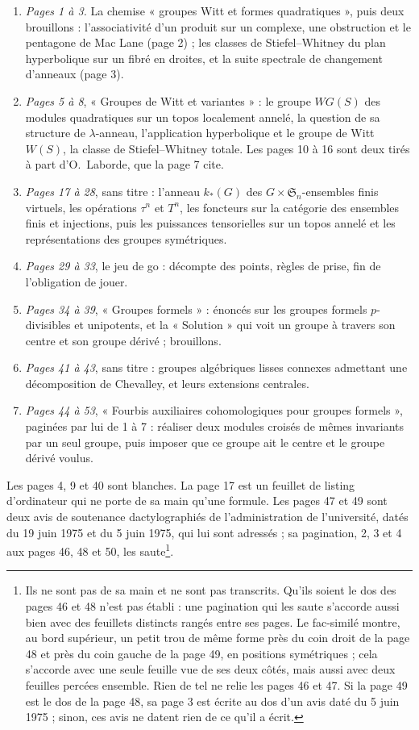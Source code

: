\documentclass[11pt,a4paper]{article}
\begin{document}
\begin{enumerate}
  \item \emph{Pages 1 à 3.} La chemise « groupes Witt et formes
  quadratiques », puis deux brouillons : l'associativité d'un produit sur un
  complexe, une obstruction et le pentagone de Mac Lane (page 2) ; les
  classes de Stiefel–Whitney du plan hyperbolique sur un fibré en droites,
  et la suite spectrale de changement d'anneaux (page 3).
  \item \emph{Pages 5 à 8}, « Groupes de Witt et variantes » : le groupe
  $WG(S)$ des modules quadratiques sur un topos localement annelé, la
  question de sa structure de $\lambda$-anneau, l'application hyperbolique
  et le groupe de Witt $W(S)$, la classe de Stiefel–Whitney totale. Les
  pages 10 à 16 sont deux tirés à part d'O.~Laborde, que la page 7 cite.
  \item \emph{Pages 17 à 28}, sans titre : l'anneau $k_{*}(G)$ des
  $G \times \mathfrak{S}_n$-ensembles finis virtuels, les opérations
  $\tau^{n}$ et $T^{n}$, les foncteurs sur la catégorie des ensembles finis
  et injections, puis les puissances tensorielles sur un topos annelé et les
  représentations des groupes symétriques.
  \item \emph{Pages 29 à 33}, le jeu de go : décompte des points, règles de
  prise, fin de l'obligation de jouer.
  \item \emph{Pages 34 à 39}, « Groupes formels » : énoncés sur les groupes
  formels $p$-divisibles et unipotents, et la « Solution » qui voit un groupe
  à travers son centre et son groupe dérivé ; brouillons.
  \item \emph{Pages 41 à 43}, sans titre : groupes algébriques lisses
  connexes admettant une décomposition de Chevalley, et leurs extensions
  centrales.
  \item \emph{Pages 44 à 53}, « Fourbis auxiliaires cohomologiques pour
  groupes formels », paginées par lui de 1 à 7 : réaliser deux modules
  croisés de mêmes invariants par un seul groupe, puis imposer que ce groupe
  ait le centre et le groupe dérivé voulus.
\end{enumerate}

Les pages 4, 9 et 40 sont blanches. La page 17 est un feuillet de listing
d'ordinateur qui ne porte de sa main qu'une formule. Les pages 47 et 49 sont
deux avis de soutenance dactylographiés de l'administration de l'université,
datés du 19 juin 1975 et du 5 juin 1975, qui lui sont adressés ; sa
pagination, 2, 3 et 4 aux pages 46, 48 et 50, les
saute\footnote{Ils ne sont pas de sa main et ne sont pas transcrits. Qu'ils
soient le dos des pages 46 et 48 n'est pas établi : une pagination qui les
saute s'accorde aussi bien avec des feuillets distincts rangés entre ses
pages. Le fac-similé montre, au bord supérieur, un petit trou de même forme
près du coin droit de la page 48 et près du coin gauche de la page 49, en
positions symétriques ; cela s'accorde avec une seule feuille vue de ses
deux côtés, mais aussi avec deux feuilles percées ensemble. Rien de tel ne
relie les pages 46 et 47. Si la page 49 est le dos de la page 48, sa page 3
est écrite au dos d'un avis daté du 5 juin 1975 ; sinon, ces avis ne datent
rien de ce qu'il a écrit.}.
\end{document}
